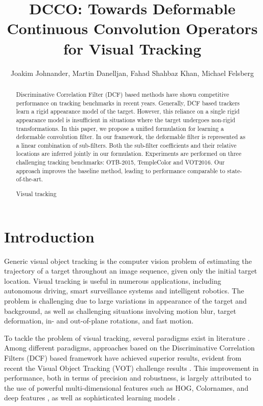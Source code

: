 \documentclass[runningheads,a4paper]{llncs}
\title{DCCO: Towards Deformable Continuous Convolution Operators for Visual Tracking}
\author{Joakim Johnander, Martin Danelljan, Fahad Shahbaz Khan, Michael Felsberg}
\institute{Computer Vision Laboratory, Dept.\ of Electrical Engineering, Link\"{o}ping University}
\newcommand{\keywords}[1]{\par\addvspace\baselineskip
	\noindent\keywordname\enspace\ignorespaces#1}
\begin{document}
\mainmatter  %

\maketitle

\begin{abstract}
Discriminative Correlation Filter (DCF) based methods have shown competitive performance on tracking benchmarks in recent years. Generally, DCF based trackers learn a rigid appearance model of the target. However, this reliance on a single rigid appearance model is insufficient in situations where the target undergoes non-rigid transformations. In this paper, we propose a unified formulation for learning a deformable convolution filter. In our framework, the deformable filter is represented as a linear combination of sub-filters. Both the sub-filter coefficients and their relative locations are inferred jointly in our formulation. Experiments are performed on three challenging tracking benchmarks: OTB-2015, TempleColor and VOT2016. Our approach improves the baseline method, leading to performance comparable to state-of-the-art.

  

\keywords{Visual tracking}
\end{abstract}\section{Introduction}
Generic visual object tracking is the computer vision problem of estimating the trajectory of a target throughout an image sequence, given only the initial target location. Visual tracking is useful in numerous applications, including autonomous driving, smart surveillance systems and intelligent robotics. The problem is challenging due to large variations in appearance of the target and background, as well as challenging situations involving motion blur, target deformation, in- and out-of-plane rotations, and fast motion.

To tackle the problem of visual tracking, several paradigms exist in literature \cite{VOT2016}. Among different paradigms, approaches based on the Discriminative Correlation Filters (DCF) based framework have achieved superior results, evident from recent the Visual Object Tracking (VOT) challenge results \cite{VOT2015}\cite{VOT2016}. This improvement in performance, both in terms of precision and robustness, is largely attributed to the use of powerful multi-dimensional features such as HOG, Colornames, and deep features \cite{DanelljanCVPR2016a}\cite{HCF_ICCV15}\cite{DanelljanCVPR14}, as well as sophisticated learning models \cite{DanelljanICCV2015}\cite{DanelljanECCV2016}.
\end{document}
